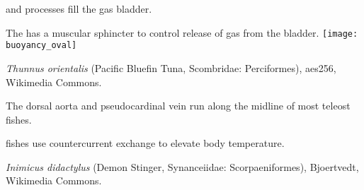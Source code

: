 \documentclass[t]{beamer}
\begin{document}
\begin{frame}[t]{ and  processes fill the gas bladder.}

\end{frame}

\begin{frame}[c]{The  has a muscular sphincter to control release of gas from the bladder.}
\centering
\texttt{[image: buoyancy\_oval]}

\end{frame}

{
	\begin{frame}[b,plain]
	
	\tiny\textcolor{white!80!black}{\textit{Thunnus orientalis} (Pacific Bluefin Tuna, Scombridae: Perciformes), aes256, Wikimedia Commons.}
\end{frame}
}


{
\begin{frame}[b,plain]{The dorsal aorta and pseudocardinal vein run along the midline of most teleost fishes.}

\end{frame}
}

{
\begin{frame}[b,plain]{ fishes use countercurrent exchange to elevate body temperature.}

\end{frame}
}

{
\begin{frame}[b,plain]

\tiny\textcolor{white!20!black}{\textit{Inimicus didactylus} (Demon Stinger, Synanceiidae: Scorpaeniformes), Bjoertvedt, Wikimedia Commons.}
\end{frame}
}
\end{document}
